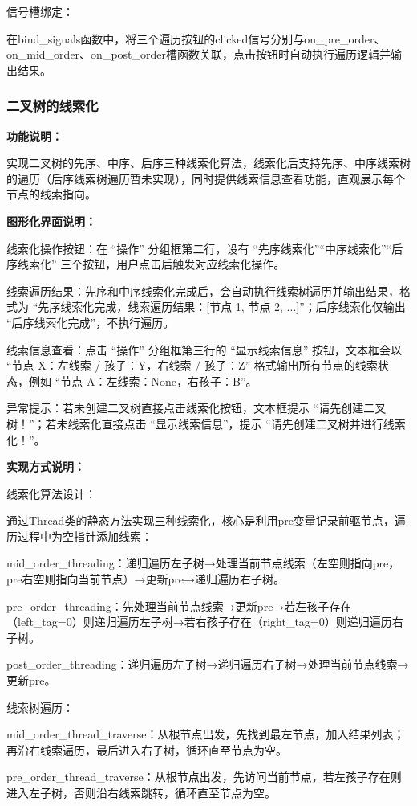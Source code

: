 \documentclass[12pt,a4paper]{article}
\begin{document}
信号槽绑定：

在bind\_signals函数中，将三个遍历按钮的clicked信号分别与on\_pre\_order、on\_mid\_order、on\_post\_order槽函数关联，点击按钮时自动执行遍历逻辑并输出结果。

\subsubsection{二叉树的线索化}

\noindent\textbf{功能说明：}

实现二叉树的先序、中序、后序三种线索化算法，线索化后支持先序、中序线索树的遍历（后序线索树遍历暂未实现），同时提供线索信息查看功能，直观展示每个节点的线索指向。

\noindent\textbf{图形化界面说明：}

线索化操作按钮：在 “操作” 分组框第二行，设有 “先序线索化”“中序线索化”“后序线索化” 三个按钮，用户点击后触发对应线索化操作。

线索遍历结果：先序和中序线索化完成后，会自动执行线索树遍历并输出结果，格式为 “先序线索化完成，线索遍历结果：[节点 1, 节点 2, ...]”；后序线索化仅输出 “后序线索化完成”，不执行遍历。

线索信息查看：点击 “操作” 分组框第三行的 “显示线索信息” 按钮，文本框会以 “节点 X：左线索 / 孩子：Y，右线索 / 孩子：Z” 格式输出所有节点的线索状态，例如 “节点 A：左线索：None，右孩子：B”。

异常提示：若未创建二叉树直接点击线索化按钮，文本框提示 “请先创建二叉树！”；若未线索化直接点击 “显示线索信息”，提示 “请先创建二叉树并进行线索化！”。

\noindent\textbf{实现方式说明：}

线索化算法设计：

通过Thread类的静态方法实现三种线索化，核心是利用pre变量记录前驱节点，遍历过程中为空指针添加线索：

mid\_order\_threading：递归遍历左子树→处理当前节点线索（左空则指向pre，pre右空则指向当前节点）→更新pre→递归遍历右子树。

pre\_order\_threading：先处理当前节点线索→更新pre→若左孩子存在（left\_tag=0）则递归遍历左子树→若右孩子存在（right\_tag=0）则递归遍历右子树。

post\_order\_threading：递归遍历左子树→递归遍历右子树→处理当前节点线索→更新pre。

线索树遍历：

mid\_order\_thread\_traverse：从根节点出发，先找到最左节点，加入结果列表；再沿右线索遍历，最后进入右子树，循环直至节点为空。

pre\_order\_thread\_traverse：从根节点出发，先访问当前节点，若左孩子存在则进入左子树，否则沿右线索跳转，循环直至节点为空。
\end{document}
